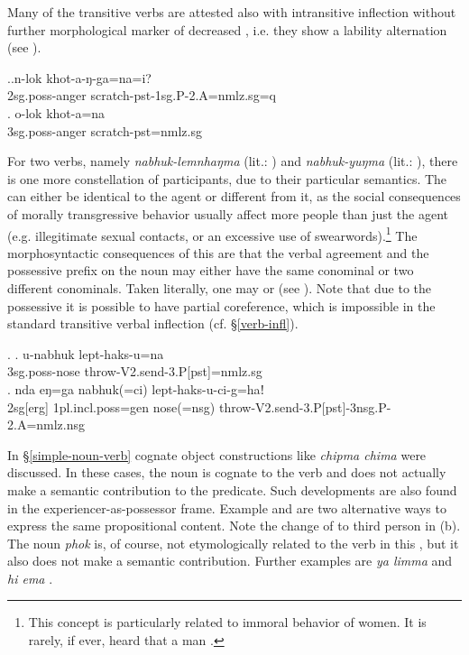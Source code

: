 Many of the transitive verbs are attested also with intransitive inflection without further morphological marker of decreased , i.e. they show a lability alternation (see \Next).

 \ex.\ag.n-lok  khot-a-ŋ-ga=na=i?\\
	{\sc 2sg.poss}-anger scratch{\sc -pst-1sg.P-2.A=nmlz.sg=q}	\\
\bg.  o-lok khot-a=na\\
{\sc 3sg.poss-}anger scratch{\sc [3sg]-pst=nmlz.sg}\\


For two verbs, namely \emph{nabhuk-lemnhaŋma}  (lit.: ) and \emph{nabhuk-yuŋma}  (lit.: ), there is one more constellation of participants, due to their particular semantics. The  can either be identical to the agent or different from it, as the social consequences of morally transgressive behavior usually affect more people than just the agent (e.g. illegitimate sexual contacts, or an excessive use of swearwords).\footnote{This concept is particularly related to immoral behavior of women. It is rarely, if ever, heard that a man .} The morphosyntactic consequences of this are that the verbal agreement and the possessive prefix on the noun may either have the same conominal or two different conominals. Taken literally, one may  or  (see \Next). Note that due to the possessive  it is possible to have partial coreference, which is impossible in the standard transitive verbal inflection (cf. §\ref{verb-infl}).


\ex. \ag. u-nabhuk lept-haks-u=na\\
{\sc 3sg.poss-}nose throw{\sc -V2.send-3.P[pst]=nmlz.sg}\\
\bg. nda eŋ=ga nabhuk(=ci) lept-haks-u-ci-g=haǃ\\
{\sc 2sg[erg]} {\sc 1pl.incl.poss=gen} nose({\sc =nsg}) throw{\sc -V2.send-3.P[pst]-3nsg.P-2.A=nmlz.nsg}\\

In §\ref{simple-noun-verb} cognate object constructions like \emph{chipma chima}  were discussed. In these cases, the noun is cognate to the verb and does not actually make a semantic contribution to the predicate. Such developments are also found in the experiencer-as-possessor frame. Example \Next[a] and \Next[b] are two alternative ways to express the same propositional content. Note the change of  to third person in (b). The noun \emph{phok}  is, of course, not etymologically related to the verb in this , but it also does not make a semantic contribution. Further examples are \emph{ya limma}  and \emph{hi ema} .

